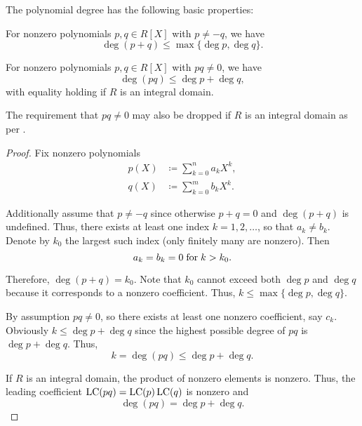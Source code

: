 \begin{proposition}\label{thm:polynomial_degree_properties}
  The polynomial degree has the following basic properties:
  \begin{thmenum}
     For nonzero polynomials \( p, q \in R[X] \) with \( p \neq -q \), we have
    \begin{equation*}
      \deg (p + q) \leq \max \{ \deg p, \deg q \}.
    \end{equation*}

     For nonzero polynomials \( p, q \in R[X] \) with \( pq \neq 0 \), we have
    \begin{equation*}
      \deg (pq) \leq \deg p + \deg q,
    \end{equation*}
    with equality holding if \( R \) is an integral domain.

    The requirement that \( pq \neq 0 \) may also be dropped if \( R \) is an integral domain as per .
  \end{thmenum}
\end{proposition}
\begin{proof}
  Fix nonzero polynomials
  \begin{align}
    p(X) &\coloneqq \sum_{k=0}^n a_k X^k, \label{eq:thm:polynomial_degree_properties/p} \\
    q(X) &\coloneqq \sum_{k=0}^m b_k X^k. \label{eq:thm:polynomial_degree_properties/q}
  \end{align}

   Additionally assume that \( p \neq -q \) since otherwise \( p + q = 0 \) and \( \deg(p + q) \) is undefined. Thus, there exists at least one index \( k = 1, 2, \ldots \), so that \( a_k \neq b_k \). Denote by \( k_0 \) the largest such index (only finitely many are nonzero). Then
  \begin{equation*}
    a_k = b_k = 0 \T{for} k > k_0.
  \end{equation*}

  Therefore, \( \deg(p + q) = k_0 \). Note that \( k_0 \) cannot exceed both \( \deg p \) and \( \deg q \) because it corresponds to a nonzero coefficient. Thus, \( k \leq \max\{ \deg p, \deg q \} \).

   By assumption \( pq \neq 0 \), so there exists at least one nonzero coefficient, say \( c_k \). Obviously \( k \leq \deg p + \deg q \) since the highest possible degree of \( pq \) is \( \deg p + \deg q \). Thus,
  \begin{equation*}
    k = \deg (pq) \leq \deg p + \deg q.
  \end{equation*}

  If \( R \) is an integral domain, the product of nonzero elements is nonzero. Thus, the leading coefficient \( \operatorname{LC}(pq) = \operatorname{LC}(p)\operatorname{LC}(q) \) is nonzero and
  \begin{equation*}
    \deg(pq) = \deg p + \deg q.
  \end{equation*}
\end{proof}

